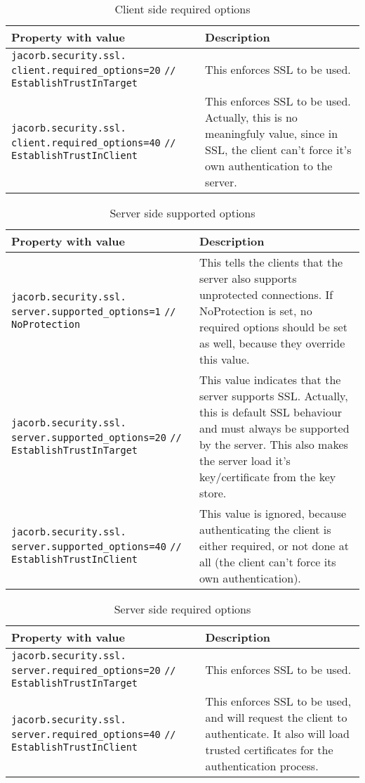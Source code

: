 \begin{table}
\caption{Client side required options}
\begin{tabular}{|p{7cm}|p{7cm}|}
\hline
\textbf{Property with value}& \textbf{Description}\\
\hline
\verb"jacorb.security.ssl."
\verb"client.required_options=20"
\verb"// EstablishTrustInTarget"& This enforces SSL to be used.\\
\hline
\verb"jacorb.security.ssl."
\verb"client.required_options=40"
\verb"// EstablishTrustInClient"& This
enforces SSL to be used. Actually, this is no meaningfuly
value, since in SSL, the client can't force it's own authentication to
the server. \\
\hline
\end{tabular}
\end{table}

\begin{table}
\caption{Server side supported options}
\begin{tabular}{|p{7cm}|p{7cm}|}
\hline
\textbf{Property with value}& \textbf{Description}\\
\hline
\verb"jacorb.security.ssl."
\verb"server.supported_options=1"
\verb"// NoProtection"& This tells the clients that the server also
supports unprotected connections. If NoProtection is set, no required
options should be set as well, because they override this value. \\
\hline
\verb"jacorb.security.ssl."
\verb"server.supported_options=20"
\verb"// EstablishTrustInTarget"& This value indicates that the server
supports SSL. Actually, this is default SSL behaviour and must always
be supported by the server. This also makes the server load it's
key/certificate from the key store.\\
\hline
\verb"jacorb.security.ssl."
\verb"server.supported_options=40"
\verb"// EstablishTrustInClient"&  This value is ignored, because
authenticating the client is either required, or not done at all (the
client can't force its own authentication).\\
\hline
\end{tabular}
\end{table}
\begin{table}

\caption{Server side required options}
\begin{tabular}{|p{7cm}|p{7cm}|}
\hline
\textbf{Property with value}& \textbf{Description}\\
\hline
\verb"jacorb.security.ssl."
\verb"server.required_options=20"
\verb"// EstablishTrustInTarget"& This enforces SSL to be used.\\
\hline
\verb"jacorb.security.ssl."
\verb"server.required_options=40"
\verb"// EstablishTrustInClient"&  This enforces SSL to be used, and
will request the client to authenticate. It also will load trusted
certificates for the authentication process.\\
\hline
\end{tabular}
\end{table}

